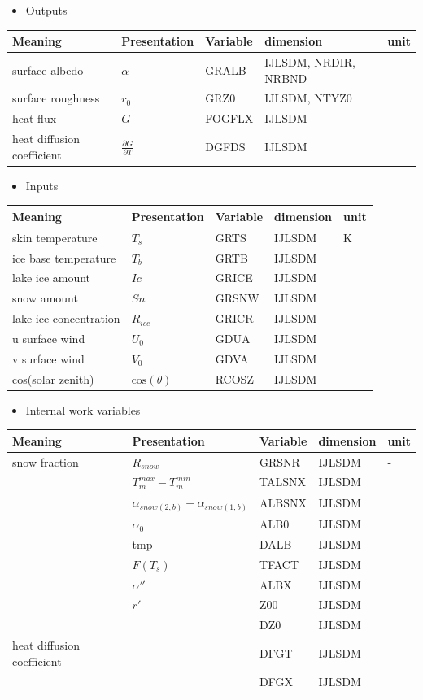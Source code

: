 \begin{itemize}
\tightlist
\item
  Outputs
\end{itemize}

\setlength\LTleft{0pt}\setlength\LTright{0pt}\begin{longtable}[]{@{}lllll@{}}
\toprule\relax
Meaning & Presentation & Variable & dimension & unit\tabularnewline
\midrule\relax
\endhead
surface albedo & \(\alpha\) & GRALB & IJLSDM, NRDIR, NRBND &
-\tabularnewline
surface roughness & \(r_0\) & GRZ0 & IJLSDM, NTYZ0 &\tabularnewline
heat flux & \(G\) & FOGFLX & IJLSDM &\tabularnewline
heat diffusion coefficient & \(\frac{\partial G}{\partial T}\) & DGFDS &
IJLSDM &\tabularnewline
\bottomrule
\end{longtable}

\begin{itemize}
\tightlist
\item
  Inputs
\end{itemize}

\setlength\LTleft{0pt}\setlength\LTright{0pt}\begin{longtable}[]{@{}lllll@{}}
\toprule\relax
Meaning & Presentation & Variable & dimension & unit\tabularnewline
\midrule\relax
\endhead
skin temperature & \(T_s\) & GRTS & IJLSDM &
\(\mathrm{K}\)\tabularnewline
ice base temperature & \(T_b\) & GRTB & IJLSDM &\tabularnewline
lake ice amount & \(Ic\) & GRICE & IJLSDM &\tabularnewline
snow amount & \(Sn\) & GRSNW & IJLSDM &\tabularnewline
lake ice concentration & \(R_{ice}\) & GRICR & IJLSDM &\tabularnewline
u surface wind & \(U_0\) & GDUA & IJLSDM &\tabularnewline
v surface wind & \(V_0\) & GDVA & IJLSDM &\tabularnewline
cos(solar zenith) & \(\mathrm{cos}(\theta)\) & RCOSZ & IJLSDM
&\tabularnewline
\bottomrule
\end{longtable}

\begin{itemize}
\tightlist
\item
  Internal work variables
\end{itemize}

\setlength\LTleft{0pt}\setlength\LTright{0pt}\begin{longtable}[]{@{}lllll@{}}
\toprule\relax
Meaning & Presentation & Variable & dimension & unit\tabularnewline
\midrule\relax
\endhead
snow fraction & \(R_{snow}\) & GRSNR & IJLSDM & -\tabularnewline
& \(T_m^{max}-T_m^{min}\) & TALSNX & IJLSDM &\tabularnewline
& \(\alpha_{snow(2,b)}-\alpha_{snow(1,b)}\) & ALBSNX & IJLSDM
&\tabularnewline
& \(\alpha_0\) & ALB0 & IJLSDM &\tabularnewline
& tmp & DALB & IJLSDM &\tabularnewline
& \(F(T_s)\) & TFACT & IJLSDM &\tabularnewline
& \(\alpha''\) & ALBX & IJLSDM &\tabularnewline
& \(r'\) & Z00 & IJLSDM &\tabularnewline
& & DZ0 & IJLSDM &\tabularnewline
heat diffusion coefficient & & DFGT & IJLSDM &\tabularnewline
& & DFGX & IJLSDM &\tabularnewline
\bottomrule
\end{longtable}

